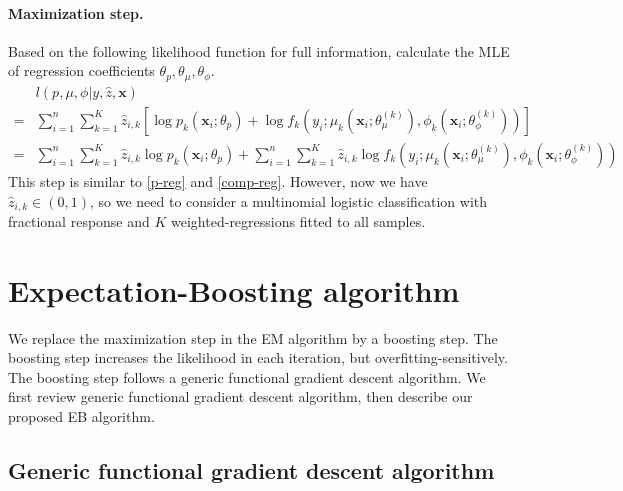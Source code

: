 \documentclass[11pt]{article}
\numberwithin{equation}{section}
\def\bx{\boldsymbol{x}}
\begin{document}
\paragraph{Maximization step.}
	Based on the following likelihood function for full information, calculate the MLE of regression coefficients  $\theta_p, \theta_\mu, \theta_\phi$.
	\begin{equation}
		\begin{aligned}
			&l(p,\mu,\phi|y,\hat{z},\bx)\\
			=&\sum_{i=1}^n\sum_{k=1}^K \hat{z}_{i,k}\left[\log p_k(\bx_i;\theta_p) + \log f_k\left(y_i;\mu_k\left(\bx_i;\theta_\mu^{(k)}\right),\phi_k\left(\bx_i;\theta_\phi^{(k)}\right)\right)\right]\\
			=&\sum_{i=1}^n\sum_{k=1}^K \hat{z}_{i,k}\log p_k(\bx_i;\theta_p) + \sum_{i=1}^n\sum_{k=1}^K \hat{z}_{i,k}\log f_k\left(y_i;\mu_k\left(\bx_i;\theta_\mu^{(k)}\right),\phi_k\left(\bx_i;\theta_\phi^{(k)}\right)\right)
		\end{aligned}
	\end{equation}
	This step is similar to \eqref{p-reg} and \eqref{comp-reg}. However, now we have $\hat{z}_{i,k}\in(0,1)$, 
	so we need to consider a multinomial logistic classification with {fractional} response and $K$ {weighted}-regressions fitted to {all} samples.

\section{Expectation-Boosting algorithm}\label{sec:EB}
We replace the maximization step in the EM algorithm by a boosting step. The boosting step increases the likelihood in each iteration, but overfitting-sensitively.
The boosting step follows a generic functional gradient descent algorithm.
We first review generic functional gradient descent algorithm, then describe our proposed EB algorithm.

\subsection{Generic functional gradient descent algorithm}
\end{document}
